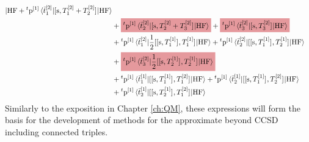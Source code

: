 \begin{equation}
\begin{aligned}
{    | \mathrm{HF}}
    +
    {}^t\p^{[1]}
    \braket{\tbar{1}^{[2]} | \commutator{\s}{T_1^{[2]} + T_2^{[2]}} |
    \mathrm{HF}} \\
    &+
    \highlight{PMS1797}{
    {}^t\p^{[1]}
    \braket{\tbar{2}^{[2]} | \commutator{\s}{T_2^{[2]} + T_3^{[2]}} | \mathrm{HF}}
    }
    +
    \highlight{PMS1797}{
    {}^t\p^{[1]}
    \braket{\tbar{3}^{[2]} | \commutator{\s}{T_3^{[2]}} | \mathrm{HF}}
    } \\
    &+
    {}^t\p^{[1]}
    \braket{\tbar{1}^{[2]} |
    \frac{1}{2}\commutator{\commutator{\s}{T_1^{[1]}}}{T_1^{[1]}}
    | \mathrm{HF}}
    +
    {}^t\p^{[1]}
    \braket{\tbar{2}^{[2]} |
    \commutator{\commutator{\s}{T_1^{[1]}}}{T_2^{[1]}}
    | \mathrm{HF}} \\
    &+
    \highlight{PMS1797}{
    {}^t\p^{[1]}
    \braket{\tbar{3}^{[2]} |
    \frac{1}{2}\commutator{\commutator{\s}{T_2^{[1]}}}{T_2^{[1]}}
    | \mathrm{HF}}
    } \\
    &+ {}^t\p^{[1]}
    \braket{\tbar{1}^{[1]} |
    \commutator{\commutator{\s}{T_1^{[1]}}}{T_1^{[2]}}
    | \mathrm{HF}}
    + {}^t\p^{[1]}
    \braket{\tbar{2}^{[1]} |
    \commutator{\commutator{\s}{T_1^{[1]}}}{T_2^{[2]}}
    | \mathrm{HF}} \\
    &+ {}^t\p^{[1]}
    \braket{\tbar{2}^{[1]} |
    \commutator{\commutator{\s}{T_2^{[1]}}}{T_1^{[2]}}
    | \mathrm{HF}}
  \end{aligned}
\end{equation}
Similarly to the exposition in Chapter \ref{ch:QM}, these expressions
will form the basis for the development of methods for the approximate
beyond \acrshort*{CCSD} including connected triples.

